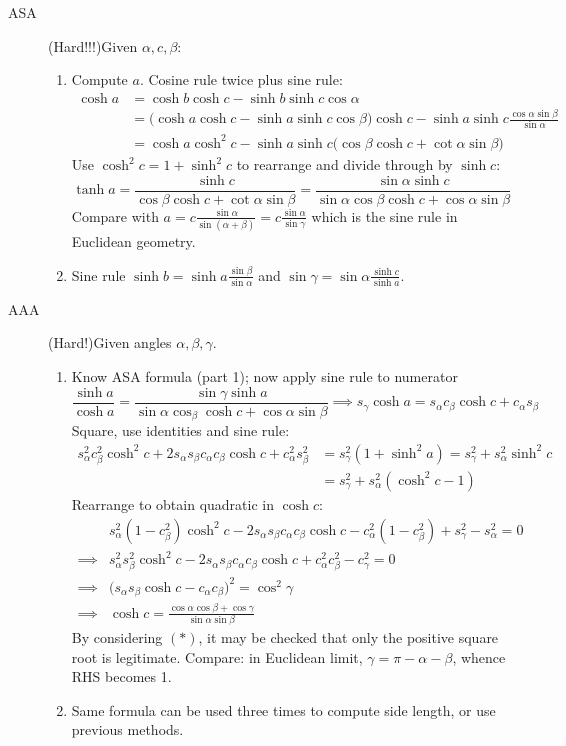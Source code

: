 \begin{description}
	\item[ASA] (Hard!!!)\lstsp Given $\alpha,c,\beta$:
	\begin{enumerate}
	  \item Compute $a$. Cosine rule twice plus sine rule:
	  \begin{align*}
	  \cosh a&=\cosh b\cosh c-\sinh b\sinh c\cos\alpha\\
	  &=\bigl(\cosh a\cosh c-\sinh a\sinh c\cos\beta\bigr)\cosh c-\sinh a\sinh c\frac{\cos\alpha\sin\beta}{\sin\alpha}\\
	  &=\cosh a\cosh^2c-\sinh a\sinh c\bigl(\cos\beta\cosh c+\cot\alpha\sin\beta\bigr)
	  \end{align*}
	  Use $\cosh^2c=1+\sinh^2c$ to rearrange and divide through by $\sinh c$:
	  \[\tanh a=\frac{\sinh c}{\cos\beta\cosh c+\cot\alpha\sin\beta}= \frac{\sin\alpha\sinh c}{\sin\alpha\cos\beta\cosh c+\cos\alpha\sin\beta}\]
	  Compare with $a=c\frac{\sin\alpha}{\sin(\alpha+\beta)} =c\frac{\sin\alpha}{\sin\gamma}$ which is the sine rule in Euclidean geometry.
	  \item Sine rule $\sinh b=\sinh a\frac{\sin\beta}{\sin\alpha}$ and $\sin\gamma=\sin\alpha\frac{\sinh c}{\sinh a}$.
	\end{enumerate}
	
	\item[AAA] (Hard!)\lstsp Given angles $\alpha,\beta,\gamma$.
	\begin{enumerate}
	  \item Know ASA formula (part 1); now apply sine rule to numerator
	  \[\frac{\sinh a}{\cosh a}=\frac{\sin\gamma\sinh a}{\sin\alpha\cos_\beta\cosh c+ \cos\alpha\sin\beta} \implies s_\gamma\cosh a=s_\alpha c_\beta\cosh c+c_\alpha s_\beta \tag{$\ast$}\]
	  Square, use identities and sine rule:
		\begin{align*}
		s^2_\alpha c^2_\beta\cosh^2c+2s_\alpha s_\beta c_\alpha c_\beta\cosh c+c_\alpha^2s^2_\beta &=s^2_\gamma(1+\sinh^2a) =s_\gamma^2+s_\alpha^2\sinh^2c\\
		&=s_\gamma^2+s_\alpha^2(\cosh^2c-1)
		\end{align*}
		Rearrange to obtain quadratic in $\cosh c$:
		\begin{align*}
		&s_\alpha^2(1-c_\beta^2)\cosh^2c-2s_\alpha s_\beta c_\alpha c_\beta\cosh c -c_\alpha^2(1-c^2_\beta)+s^2_\gamma-s^2_\alpha=0\\
		\implies &s_\alpha^2s_\beta^2\cosh^2c-2s_\alpha s_\beta c_\alpha c_\beta\cosh c +c_\alpha^2c^2_\beta-c^2_\gamma=0\\
		\implies &\bigl(s_\alpha s_\beta\cosh c-c_\alpha c_\beta\bigr)^2=\cos^2\gamma\\
		\implies &\cosh c=\frac{\cos\alpha\cos\beta+\cos\gamma}{\sin\alpha\sin\beta}
		\end{align*}
		By considering $(\ast)$, it may be checked that only the positive square root is legitimate. Compare: in Euclidean limit, $\gamma=\pi-\alpha-\beta$, whence RHS becomes 1.
		\item Same formula can be used three times to compute side length, or use previous methods.
	\end{enumerate}
	  

\end{description}
